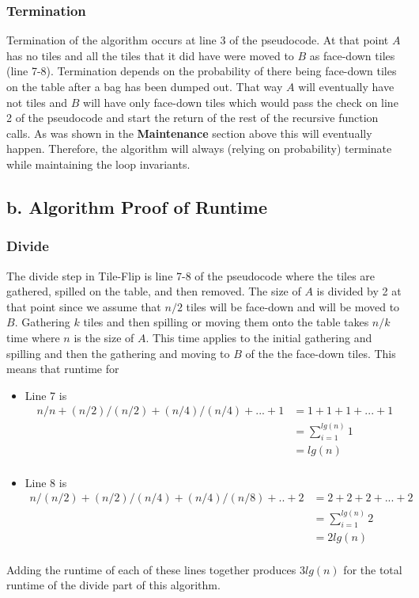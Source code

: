 \documentclass[12pt]{article}
\begin{document}
\subsubsection*{Termination}
Termination of the algorithm occurs at line 3 of the pseudocode.  At that point $A$ has no tiles and all the tiles that it did have were moved to $B$ as face-down tiles (line 7-8).  Termination depends on the probability of there being face-down tiles on the table after a bag has been dumped out.  That way $A$ will eventually have not tiles and $B$ will have only face-down tiles which would pass the check on line 2 of the pseudocode and start the return of the rest of the recursive function calls.  As was shown in the \textbf{Maintenance} section above this will eventually happen.  Therefore, the algorithm will always (relying on probability) terminate while maintaining the loop invariants.

\subsection*{b. Algorithm Proof of Runtime}

\subsubsection*{Divide}
The divide step in Tile-Flip is line 7-8 of the pseudocode where the tiles are gathered, spilled on the table, and then removed.  The size of $A$ is divided by 2 at that point since we assume that $n/2$ tiles will be face-down and will be moved to $B$.
Gathering $k$ tiles and then spilling or moving them onto the table takes $n/k$ time where $n$ is the size of $A$.  This time applies to the initial gathering and spilling and then the gathering and moving to $B$ of the the face-down tiles.  This means that runtime for 
\begin{itemize}
\item Line 7 is 
\begin{align*}
n/n + (n/2)/(n/2) + (n/4)/(n/4) +...+ 1 &= 1+1+1+...+1 \\
						       &=  \sum_{i=1}^{lg(n)} 1\\
						       &=lg(n)\\
\end{align*}
\item Line 8 is 
\begin{align*}
n/(n/2) + (n/2)/(n/4) + (n/4)/(n/8) +..+2 &= 2+2+2+...+2\\
							  &= \sum_{i=1}^{lg(n)} 2\\
							  &=2lg(n)\\
\end{align*}
\end{itemize}  
Adding the runtime of each of these lines together produces $3lg(n)$ for the total runtime of the divide part of this algorithm.\\
\end{document}
